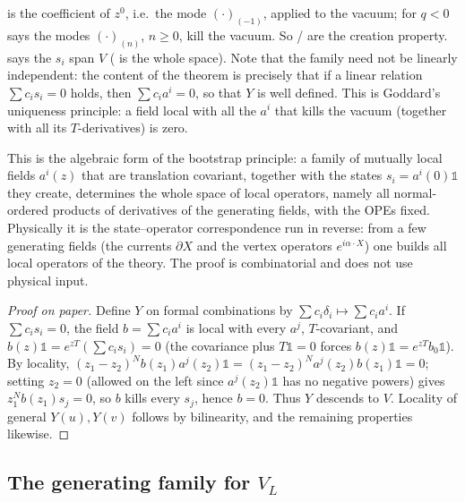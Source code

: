 \begin{dictionary}
 is the coefficient of $z^0$, i.e.\ the mode $(\cdot)_{(-1)}$, applied to the
vacuum;  for $q<0$ says the modes $(\cdot)_{(n)}$, $n\ge0$, kill the
vacuum. So / are the creation property.  says the $s_i$ span $V$ ( is the whole space). Note that the family
 need not be linearly independent: the content of the theorem is precisely that if a
linear relation $\sum c_is_i=0$ holds, then $\sum c_ia^i=0$, so that $Y$ is well defined. This is
Goddard's uniqueness principle: a field local with all the $a^i$ that kills the vacuum (together
with all its $T$-derivatives) is zero.
\end{dictionary}

\begin{physics}
This is the algebraic form of the bootstrap principle: a family of mutually local fields $a^i(z)$ that are translation covariant, together with the states $s_i=a^i(0)\mathbb1$ they create, determines the whole space of local operators, namely all normal-ordered products of derivatives of the generating fields, with the OPEs fixed. Physically it is the state--operator correspondence run in reverse: from a few generating fields (the currents $\partial X$ and the vertex operators $e^{i\alpha\cdot X}$) one builds all local operators of the theory. The proof is combinatorial and does not use physical input.
\end{physics}

\begin{proof}[Proof on paper]
Define $Y$ on formal combinations by $\sum c_i\delta_i\mapsto\sum c_ia^i$. If $\sum c_is_i=0$, the
field $b=\sum c_ia^i$ is local with every $a^j$, $T$-covariant, and $b(z)\mathbb1=e^{zT}(\sum c_i
s_i)=0$ (the covariance plus $T\mathbb 1=0$ forces $b(z)\mathbb 1=e^{zT}b_{0}\mathbb1$). By
locality, $(z_1-z_2)^Nb(z_1)a^j(z_2)\mathbb 1=(z_1-z_2)^Na^j(z_2)b(z_1)\mathbb1=0$; setting
$z_2=0$ (allowed on the left since $a^j(z_2)\mathbb 1$ has no negative powers) gives
$z_1^Nb(z_1)s_j=0$, so $b$ kills every $s_j$, hence $b=0$. Thus $Y$ descends to $V$. Locality of
general $Y(u),Y(v)$ follows by bilinearity, and the remaining properties likewise.
\end{proof}

\subsection{The generating family for \texorpdfstring{$V_L$}{V\_L}}

